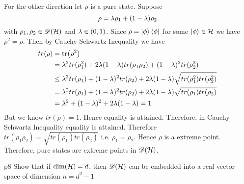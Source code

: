 \documentclass[a4paper, 11pt]{article}
\begin{document}
{\begin{itemize}
For the other direction let $\rho$ is a pure state. Suppose $$\rho=\lambda\rho_1+(1-\lambda)\rho_2$$ with $\rho_1,\rho_2\in{\mathscr{D}}(\mathcal{H})$ and $\lambda\in (0,1)$. Since $\rho=\ket{\phi}\bra{\phi}$ for some $\ket{\phi}\in \mathcal{H}$ we have $\rho^2=\rho$. Then  by Cauchy-Schwartz Inequality we have \begin{align*}
	tr(\rho) & =\tr(\rho^2)                                                                       \\
	         & = \lambda^2tr(\rho_1^2)+2\lambda(1-\lambda)tr(\rho_1\rho_2)+(1-\lambda)^2tr(\rho_2^2)              \\
	         & \leq\lambda^2tr(\rho_1)+(1-\lambda)^2tr(\rho_2)+2\lambda(1-\lambda)\sqrt{tr(\rho_1^2)tr(\rho_2^2)} \\
	         & =\lambda^2tr(\rho_1)+(1-\lambda)^2tr(\rho_2)+2\lambda(1-\lambda)\sqrt{tr(\rho_1)tr(\rho_2)}        \\
	         & = \lambda^2+(1-\lambda)^2+2\lambda(1-\lambda)=1
\end{align*}
But we know $tr(\rho)=1$. Hence equality is attained. Therefore, in Cauchy-Schwartz Inequality equality is attained. Therefore $tr(\rho_1\rho_2)=\sqrt{tr(\rho_1)tr(\rho_2)}$ i.e. $\rho_1=\rho_2$. Hence $\rho$ is a extreme point. Therefore, pure states are extreme points in ${\mathscr{D}}(\mathcal{H})$. 
\end{itemize}
}


\begin{problem}{%
	}{p8%
	}
Show that if $\dim(\mathcal{H})=d$, then ${\mathscr{D}}(\mathcal{H})$ can be embedded  into a real vector space  of dimension $n=d^2-1$
\end{problem}
\end{document}
